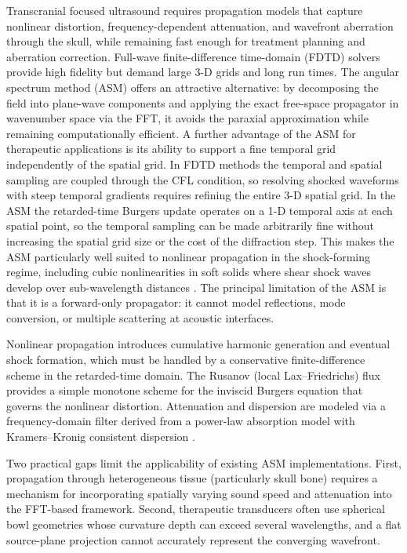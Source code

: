\documentclass[11pt]{article}
\begin{document}
Transcranial focused ultrasound requires propagation models that
capture nonlinear distortion, frequency-dependent attenuation, and
wavefront aberration through the skull, while remaining fast enough
for treatment planning and aberration correction.  Full-wave
finite-difference time-domain (FDTD) solvers
\cite{pinton2009,pinton2014} provide high fidelity but demand large
3-D grids and long run times.  The angular spectrum method (ASM)
\cite{christopher1991,du1985,zemp2010,dagrau2011,luo2020} offers an
attractive alternative: by decomposing the field into plane-wave
components and applying the exact free-space propagator in wavenumber
space via the FFT, it avoids the paraxial approximation while
remaining computationally efficient.  A further advantage of the ASM for
therapeutic applications is its ability to support a fine temporal
grid independently of the spatial grid.  In FDTD methods the temporal
and spatial sampling are coupled through the CFL condition, so
resolving shocked waveforms with steep temporal gradients requires
refining the entire 3-D spatial grid.  In the ASM the retarded-time
Burgers update operates on a 1-D temporal axis at each spatial point,
so the temporal sampling can be made arbitrarily fine without
increasing the spatial grid size or the cost of the diffraction step.
This makes the ASM particularly well suited to nonlinear propagation
in the shock-forming regime, including cubic nonlinearities in soft
solids where shear shock waves develop over sub-wavelength distances
\cite{pinton2010,giammarinaro2016}.  The principal limitation of the ASM is
that it is a forward-only propagator: it cannot model reflections,
mode conversion, or multiple scattering at acoustic interfaces.

Nonlinear propagation introduces cumulative harmonic generation and
eventual shock formation, which must be handled by a conservative
finite-difference scheme in the retarded-time domain.  The Rusanov
(local Lax--Friedrichs) flux \cite{rusanov1962} provides a simple
monotone scheme for the inviscid Burgers equation that governs the
nonlinear distortion.  Attenuation and dispersion are modeled via a
frequency-domain filter derived from a power-law absorption model with
Kramers--Kronig consistent dispersion \cite{pinton2009,treeby2012}.

Two practical gaps limit the applicability of existing ASM
implementations.  First, propagation through heterogeneous tissue
(particularly skull bone) requires a mechanism for incorporating
spatially varying sound speed and attenuation into the FFT-based
framework.  Second, therapeutic transducers often use spherical bowl
geometries whose curvature depth can exceed several wavelengths, and a
flat source-plane projection cannot accurately represent the
converging wavefront.
\end{document}
